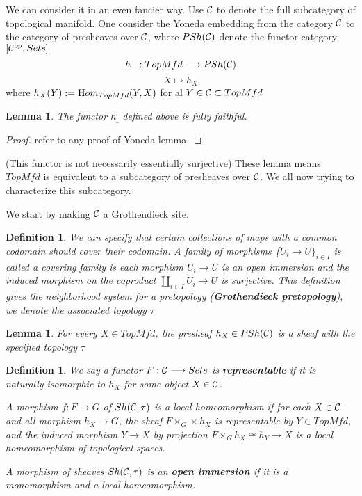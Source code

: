 \documentclass[11pt]{article}
\newtheorem{lemma}[thm]{Lemma}
\newtheorem{dfn}[thm]{Definition}
\renewcommand{\hom}{{\text Hom}}
\newcommand{\calc}{{\cal C}}
\newcommand{\lrta}{\longrightarrow}
\begin{document}
We can consider it in an even fancier way. Use $\calc$ to denote the full subcategory of topological manifold. One consider the Yoneda embedding from the category $\calc$ to the category of presheaves over $\calc$, where $PSh(\calc)$ denote the functor category $[\calc^{op},Sets]$
$$
h_{\_}: TopMfd\lrta PSh(\calc)
$$
$$
X\longmapsto h_X
$$
where $h_X(Y):=\hom_{TopMfd}(Y,X)$ for al $Y\in \calc\subset TopMfd$
\begin{lemma}
The functor $h_\_$ defined above is fully faithful. 
\end{lemma}
\begin{proof}
refer to any proof of Yoneda lemma.
\end{proof}
(This functor is not necessarily essentially surjective)
These lemma means $TopMfd$ is equivalent to a subcategory of presheaves over $\calc$. We all now trying to characterize this subcategory.

We start by making $\calc$ a Grothendieck site.
\begin{dfn}
We can specify that certain collections of maps with a common codomain should cover their codomain. A family of morphisms \{$U_i\lrta U\}_{i\in I}$ is called a covering family is each morphism $U_i\lrta U$ is an open immersion and the induced morphism on the coproduct $\coprod_{i\in I}U_i\lrta U$ is surjective. This definition gives the neighborhood system for a pretopology (\textbf{Grothendieck pretopology}), we denote the associated topology $\tau$
\end{dfn}
\begin{lemma}
For every $X\in TopMfd$, the presheaf $h_X\in PSh(\calc)$ is a sheaf with the specified topology $\tau$
\end{lemma}

\begin{dfn}
We say a functor $F:\calc\lrta Sets $ is \textbf{representable} if it is naturally isomorphic to $h_X$ for some object $X\in\calc$.

A morphism $f:F\lrta G$  of $Sh(\calc,\tau)$ is a local homeomorphism if for each $X\in \calc$ and all morphism $h_X\lrta G$, the sheaf $F\times_G\times h_X$ is representable by $Y\in TopMfd$, and the induced morphism $Y\lrta X$ by projection $F\times_G h_X\cong h_Y\lrta X$ is a local homeomorphism of topological spaces.

A morphism of sheaves $Sh(\calc,\tau)$ is an \textbf{open immersion} if it is a monomorphism and a local homeomorphism.
\end{dfn}
\end{document}
